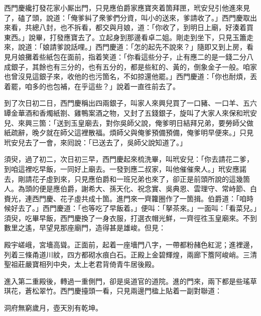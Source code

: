 西門慶纔打發花家小厮出門，只見應伯爵家應寶夾着箇拜匣，玳安兒引他進來見了，磕了頭，說道：「俺爹糾了衆爹們分資，叫小的送來，爹請收了。」西門慶取出來看，共總八封，也不拆看，都交與月娘，道：「你收了，到明日上廟，好湊着買東西。」說畢，打發應寶去了。立起身到那邊看卓二姐。剛走到坐下，只見玉簫走來，說道：「娘請爹說話哩。」{}西門慶道：「怎的起先不說來？」隨即又到上房，看見月娘攤着些紙包在面前，指着笑道：「你看這些分子，止有應二的是一錢二分八成銀子，其餘也有三分的，也有五分的，都是些紅的、黃的，倒象金子一般。咱家也曾沒見這銀子來，收他的也污箇名，不如掠還他罷。」西門慶道：「你也耐煩，丟着罷，咱多的也包補，在乎這些？」說着一直徃前去了。

到了次日初二日，西門慶稱出四兩銀子，叫家人來興兒買了一口豬、一口羊、五六罈金華酒和香燭紙劄、雞鴨案酒之物，又封了五錢銀子，旋叫了大家人來保和玳安兒、來興三箇：「送到玉皇廟去，對你吳師父說，俺爹明日結拜兄弟，要勞師父做紙疏辭，晚夕就在師父這裡散福。煩師父與俺爹預備預備，俺爹明早便來。」只見玳安兒去了一會，來囘說：「已送去了，吳師父說知道了。」

須臾，過了初二，次日初三早，西門慶起來梳洗畢，叫玳安兒：「你去請花二爹，到咱這裡吃早飯，一同好上廟去。一發到應二叔家，叫他催催衆人。」玳安應諾去，剛請花子虛到來，只見應伯爵和一班兄弟也來了，卻正是前頭所說的這幾箇人。為頭的便是應伯爵，謝希大、孫天化、祝念實、吳典恩、雲理守、常峙節、白賚光，連西門慶、花子虛共成十箇。進門來一齊籮圈作了一箇揖。伯爵道：「咱時候好去了。」西門慶道：「也等吃了早飯着。」便叫：「拏茶來。」一面叫：「看菜兒。」須臾，吃畢早飯，西門慶換了一身衣服，打選衣帽光鮮，一齊徑徃玉皇廟來。不到數里之遙，早望見那座廟門，造得甚是雄峻。但見：

\begin{myquote}
殿宇嵯峨，宮墻高聳。正面前，起着一座墻門八字，一帶都粉赭色紅泥；進裡邊，列着三條甬道川紋，四方都砌水痕白石。正殿上金碧輝煌，兩廊下簷阿峻峭。三清聖祖莊嚴寶相列中央，太上老君背倚青牛居後殿。
\end{myquote}

進入第二重殿後，轉過一重側門，卻是吳道官的道院。進的門來，兩下都是些瑤草琪花，蒼松翠竹。西門慶擡頭一看，只見兩邊門楹上貼着一副對聯道：

\begin{myquote}
洞府無窮歲月，壺天別有乾坤。
\end{myquote}

